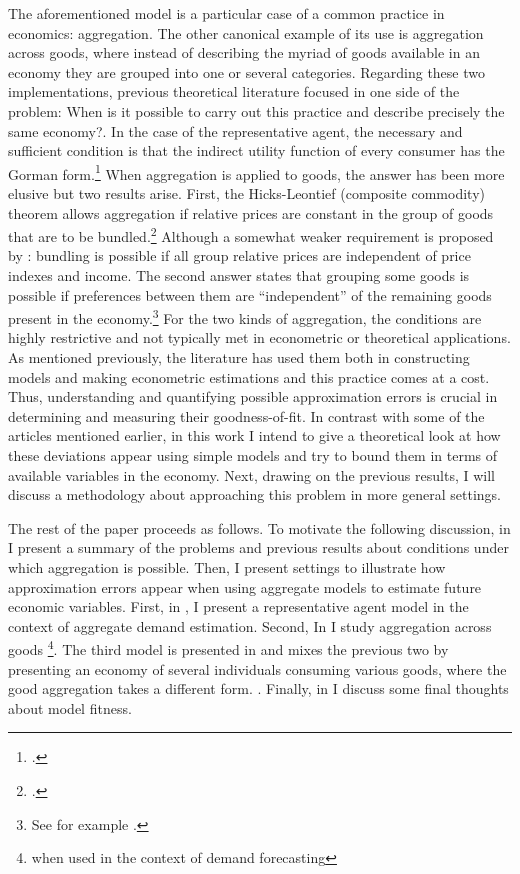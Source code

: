 \documentclass[english, a4paper,12pt]{article}
\begin{document}
The aforementioned model is a particular case of a common practice in economics: aggregation. The other canonical example of its use is aggregation across goods, where instead of describing the myriad of goods available in an economy they are grouped into one or several categories. Regarding these two implementations, previous theoretical literature focused in one side of the problem: When is it possible to carry out this practice and describe precisely the same economy?. In the case of the representative agent, the necessary and sufficient condition is that the indirect utility function of every consumer has the Gorman form.\footnote{\cite{Gorman53}.} When aggregation is applied to goods, the answer has been more elusive but two results arise. First, the Hicks-Leontief (composite commodity) theorem allows aggregation if relative prices are constant in the group of goods that are to be bundled.\footnote{\cite{Leontief36, HicksBook}.} Although a somewhat weaker requirement is proposed by \cite{Lewbel96}: bundling is possible if all group relative prices are independent of price indexes and income. The second answer states that grouping some goods is possible if preferences between them are ``independent'' of the remaining goods present in the economy.\footnote{See for example \cite{GormanSeparability}.} For the two kinds of aggregation, the conditions are highly restrictive and not typically met in econometric or theoretical applications. As mentioned previously, the literature has used them both in constructing models and making econometric estimations and this practice comes at a cost. Thus, understanding and quantifying possible approximation errors is crucial in determining and measuring their goodness-of-fit. In contrast with some of the articles mentioned earlier, in this work I intend to give a theoretical look at how these deviations appear using simple models and try to bound them in terms of available variables in the economy. Next, drawing on the previous results, I will discuss a methodology about approaching this problem in more general settings.

The rest of the paper proceeds as follows. To motivate the following discussion, in  I present a summary of the problems and previous results about conditions under which aggregation is possible. Then, I present  settings to illustrate how approximation errors appear when using aggregate models to estimate future economic variables. First, in , I present a representative agent model in the context of aggregate demand estimation. Second, In  I study aggregation across goods \footnote{when used in the context of demand forecasting}. The third model is presented in  and mixes the previous two by presenting an economy of several individuals consuming various goods, where the good aggregation takes a different form. . Finally, in  I discuss some final thoughts about model fitness.
\end{document}
